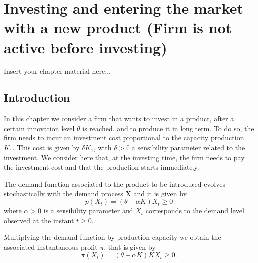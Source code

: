 
\chapter{Investing and entering the market with a new product (Firm is not active before investing)}
\label{chapter:background}

Insert your chapter material here...


\section{Introduction}
\label{section:overview}

In this chapter we consider a firm that wants to invest in a product, after a certain innovation level $\theta$ is reached, and to produce it in long term. To do so, the firm needs to incur an investment cost proportional to the capacity production $K_1$. This cost is given by $\delta K_1$, with $\delta>0$ a sensibility parameter related to the investment. We consider here that, at the investing time, the firm needs to pay the investment cost and that the production starts immediately.


The demand function associated to the product to be introduced evolves stochastically with the demand process \textbf{X} and it is given by
\begin{equation}
p(X_t)=(\theta-\alpha K) X_t \geq 0
\label{prob1:pi}
\end{equation}
where $\alpha>0$ is a sensibility parameter and $X_t$ corresponds to the demand level observed at the instant $t\geq0$.

Multiplying the demand function by production capacity we obtain the associated instantaneous profit $\pi$, that is given by
\begin{equation}
\pi(X_t)=(\theta-\alpha K)K X_t \geq 0.
\label{prob1:pi}
\end{equation}


